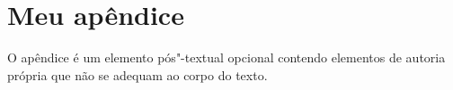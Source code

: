 \chapter{Meu apêndice}

O apêndice é um elemento pós"-textual opcional contendo elementos de autoria própria que não se adequam ao corpo do texto.
